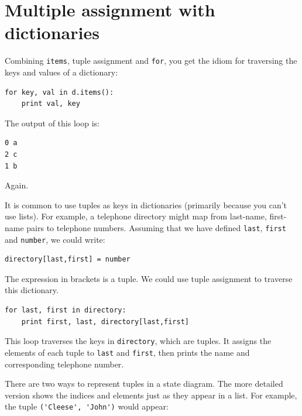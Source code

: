 \documentclass[10pt]{book}
\begin{document}

\section{Multiple assignment with dictionaries}


Combining {\tt items}, tuple assignment and {\tt for}, you
get the idiom for traversing the keys and values of a dictionary:

\beforeverb
\begin{verbatim}
for key, val in d.items():
    print val, key
\end{verbatim}
\afterverb
%
The output of this loop is:

\beforeverb
\begin{verbatim}
0 a
2 c
1 b
\end{verbatim}
\afterverb
%
Again.


It is common to use tuples as keys in dictionaries (primarily because
you can't use lists).  For example, a telephone directory might map
from last-name, first-name pairs to telephone numbers.  Assuming
that we have defined {\tt last}, {\tt first} and {\tt number}, we
could write:

\beforeverb
\begin{verbatim}
directory[last,first] = number
\end{verbatim}
\afterverb
%
The expression in brackets is a tuple.  We could use tuple
assignment to traverse this dictionary.


\beforeverb
\begin{verbatim}
for last, first in directory:
    print first, last, directory[last,first]
\end{verbatim}
\afterverb
%
This loop traverses the keys in {\tt directory}, which are tuples.  It
assigns the elements of each tuple to {\tt last} and {\tt first}, then
prints the name and corresponding telephone number.

There are two ways to represent tuples in a state diagram.  The more
detailed version shows the indices and elements just as they appear in
a list.  For example, the tuple \verb"('Cleese', 'John')" would appear:

\end{document}
